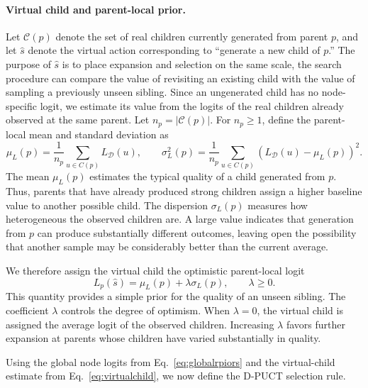 \documentclass{article} %
\newcommand{\Ch}[1]{\mathcal{C}(#1)}
\begin{document}
\paragraph{Virtual child and parent-local prior.}
Let $\Ch p$ denote the set of real children currently generated from parent
$p$, and let $\hat{s}$ denote the virtual action corresponding to
``generate a new child of $p$.'' The purpose of $\hat{s}$ is to place
expansion and selection on the same scale, the search procedure can compare
the value of revisiting an existing child with the value of sampling a
previously unseen sibling.
Since an ungenerated child has no node-specific logit, we estimate its value
from the logits of the real children already observed at the same parent. Let
$n_p = |\Ch p|$. For $n_p \geq 1$, define the parent-local mean and standard
deviation as
\begin{equation*}
\mu_L(p)
=
\frac{1}{n_p}
\sum_{u\in C(p)} L_{\mathcal D}(u),
\qquad
\sigma^2_L(p)
=
\frac{1}{n_p}
\sum_{u\in C(p)}
\left(
L_{\mathcal D}(u)-\mu_L(p)
\right)^2.
\end{equation*}
The mean $\mu_L(p)$ estimates the typical quality of a child generated from
$p$. Thus, parents that have already produced strong children assign a higher
baseline value to another possible child. The dispersion $\sigma_L(p)$ measures
how heterogeneous the observed children are. A large value indicates that
generation from $p$ can produce substantially different outcomes, leaving open
the possibility that another sample may be considerably better than the
current average.

We therefore assign the virtual child the optimistic parent-local logit
\begin{equation}
L_p(\hat{s})
=
\mu_L(p)
+
\lambda \sigma_L(p),
\qquad
\lambda \geq 0.
\label{eq:virtualchild}
\end{equation}
This quantity
provides a
simple prior for the quality of an unseen sibling. The coefficient $\lambda$
controls the degree of optimism. When $\lambda=0$, the virtual child is assigned
the average logit of the observed children. Increasing $\lambda$ favors further
expansion at parents whose children have varied substantially in quality.



Using the global node logits from Eq.~\eqref{eq:globalrpiors} and the
virtual-child estimate from Eq.~\eqref{eq:virtualchild}, we now define the
D-PUCT selection rule.
\end{document}
